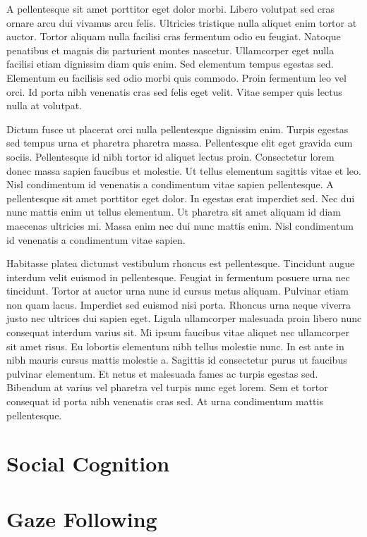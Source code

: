 \documentclass[
]{scrbook}
\begin{document}
A pellentesque sit amet porttitor eget dolor morbi. Libero volutpat sed cras ornare arcu dui vivamus arcu felis. Ultricies tristique nulla aliquet enim tortor at auctor. Tortor aliquam nulla facilisi cras fermentum odio eu feugiat. Natoque penatibus et magnis dis parturient montes nascetur. Ullamcorper eget nulla facilisi etiam dignissim diam quis enim. Sed elementum tempus egestas sed. Elementum eu facilisis sed odio morbi quis commodo. Proin fermentum leo vel orci. Id porta nibh venenatis cras sed felis eget velit. Vitae semper quis lectus nulla at volutpat.

Dictum fusce ut placerat orci nulla pellentesque dignissim enim. Turpis egestas sed tempus urna et pharetra pharetra massa. Pellentesque elit eget gravida cum sociis. Pellentesque id nibh tortor id aliquet lectus proin. Consectetur lorem donec massa sapien faucibus et molestie. Ut tellus elementum sagittis vitae et leo. Nisl condimentum id venenatis a condimentum vitae sapien pellentesque. A pellentesque sit amet porttitor eget dolor. In egestas erat imperdiet sed. Nec dui nunc mattis enim ut tellus elementum. Ut pharetra sit amet aliquam id diam maecenas ultricies mi. Massa enim nec dui nunc mattis enim. Nisl condimentum id venenatis a condimentum vitae sapien.

Habitasse platea dictumst vestibulum rhoncus est pellentesque. Tincidunt augue interdum velit euismod in pellentesque. Feugiat in fermentum posuere urna nec tincidunt. Tortor at auctor urna nunc id cursus metus aliquam. Pulvinar etiam non quam lacus. Imperdiet sed euismod nisi porta. Rhoncus urna neque viverra justo nec ultrices dui sapien eget. Ligula ullamcorper malesuada proin libero nunc consequat interdum varius sit. Mi ipsum faucibus vitae aliquet nec ullamcorper sit amet risus. Eu lobortis elementum nibh tellus molestie nunc. In est ante in nibh mauris cursus mattis molestie a. Sagittis id consectetur purus ut faucibus pulvinar elementum. Et netus et malesuada fames ac turpis egestas sed. Bibendum at varius vel pharetra vel turpis nunc eget lorem. Sem et tortor consequat id porta nibh venenatis cras sed. At urna condimentum mattis pellentesque.

\section{Social Cognition}\label{social-cognition}

\section{Gaze Following}\label{gaze-following}
\end{document}
